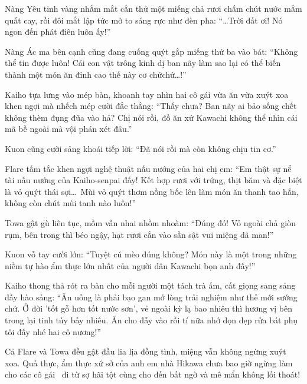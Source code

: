 \documentclass[../main.tex]{subfiles}
\begin{document}
Nàng Yêu tinh vàng nhắm mắt cắn thử một miếng chả rươi chấm chút nước mắm quất cay, rồi đôi mắt lập tức mở to sáng rực như đèn pha: ``\dots Trời đất ơi! Nó ngon đến phát điên luôn ấy!''

Nàng Ác ma bên cạnh cũng đang cuống quýt gắp miếng thứ ba vào bát: ``Không thể tin được luôn! Cái con vật trông kinh dị ban nãy làm sao lại có thể biến thành một món ăn đỉnh cao thế này cơ chứchứ\dots!''

Kaiho tựa lưng vào mép bàn, khoanh tay nhìn hai cô gái vừa ăn vừa xuýt xoa khen ngợi mà nhếch mép cười đắc thắng: ``Thấy chưa? Ban nãy ai bảo sống chết không thèm đụng đũa vào hả? Chị nói rồi, đồ ăn xứ Kawachi không thể nhìn cái mã bề ngoài mà vội phán xét đâu.''

Kuon cũng cười sảng khoái tiếp lời: ``Đã nói rồi mà còn không chịu tin cơ.''

Flare tấm tắc khen ngợi nghệ thuật nấu nướng của hai chị em: ``Em thật sự nể tài nấu nướng của Kaiho-senpai đấy! Kết hợp rươi với trứng, thịt băm và đặc biệt là vỏ quýt thái sợi\dots\ Mùi vỏ quýt thơm nồng bốc lên làm món ăn thanh tao hẳn, không còn chút mùi tanh nào luôn!''

Towa gật gù liên tục, mồm vẫn nhai nhồm nhoàm: ``Đúng đó! Vỏ ngoài chả giòn rụm, bên trong thì béo ngậy, hạt rươi cắn vào sần sật vui miệng dã man!''

Kuon vỗ tay cười lớn: ``Tuyệt cú mèo đúng không? Món này là một trong những niềm tự hào ẩm thực lớn nhất của người dân Kawachi bọn anh đấy!''

Kaiho thong thả rót ra bàn cho mỗi người một tách trà ấm, cất giọng sang sảng đầy hào sảng: ``Ăn uống là phải bạo gan mở lòng trải nghiệm như thế mới sướng chứ. Ở đời 'tốt gỗ hơn tốt nước sơn', vẻ ngoài kỳ lạ bao nhiêu thì hương vị bên trong lại tinh túy bấy nhiêu. Ăn cho đẫy vào rồi tí nữa nhớ dọn dẹp rửa bát phụ tôi đấy nhé hai cô nương!''

Cả Flare và Towa đều gật đầu lia lịa đồng tình, miệng vẫn không ngừng xuýt xoa. Quả thực, ẩm thực xứ sở của anh em nhà Hikawa chưa bao giờ ngừng làm cho các cô gái \hll\ đi từ sợ hãi tột cùng cho đến bất ngờ và mê mẩn không lối thoát!
\end{document}
